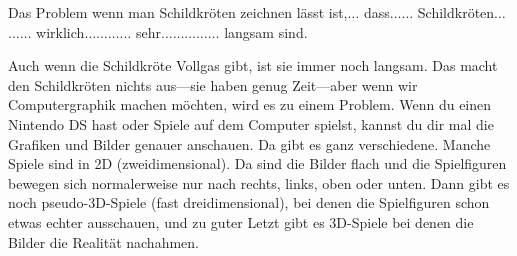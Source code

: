 Das Problem wenn man Schildkröten zeichnen lässt ist,\texorpdfstring{$\ldots$}{...} dass\texorpdfstring{$\ldots$}{...}\texorpdfstring{$\ldots$}{...} Schildkröten\texorpdfstring{$\ldots$}{...}\texorpdfstring{$\ldots$}{...}\texorpdfstring{$\ldots$}{...} wirklich\texorpdfstring{$\ldots$}{...}\texorpdfstring{$\ldots$}{...}\texorpdfstring{$\ldots$}{...}\texorpdfstring{$\ldots$}{...} sehr\texorpdfstring{$\ldots$}{...}\texorpdfstring{$\ldots$}{...}\texorpdfstring{$\ldots$}{...}\texorpdfstring{$\ldots$}{...}\texorpdfstring{$\ldots$}{...} langsam sind.
\par
Auch wenn die Schildkröte Vollgas gibt, ist sie immer noch langsam. Das macht den Schildkröten nichts aus---sie haben genug Zeit---aber wenn wir Computergraphik machen möchten, wird es zu einem Problem. Wenn du einen Nintendo DS hast oder Spiele auf dem Computer spielst, kannst du dir mal die Grafiken und Bilder genauer anschauen. Da gibt es ganz verschiedene. Manche Spiele sind in 2D (zweidimensional). Da sind die Bilder flach und die Spielfiguren bewegen sich normalerweise nur nach rechts, links, oben oder unten. Dann gibt es noch pseudo-3D-Spiele (fast dreidimensional), bei denen die Spielfiguren schon etwas echter ausschauen, und zu guter Letzt gibt es 3D-Spiele bei denen die Bilder die Realität nachahmen. 

